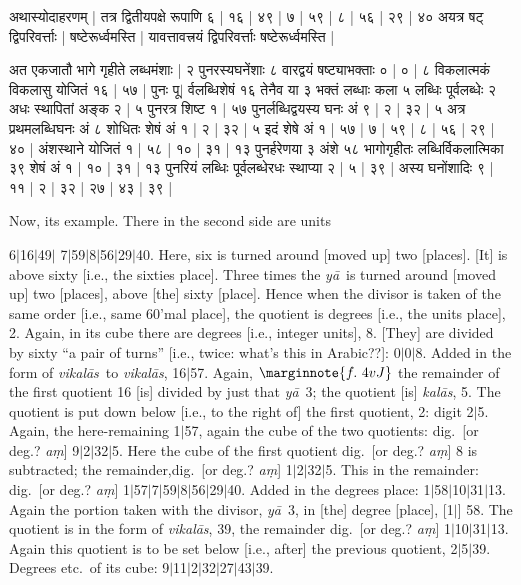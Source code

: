 \documentclass[12pt]{book}
\let\*=\d
\def\kalas{\textit{ka\-l\=as}}
\def\ya{\textit{y\=a}}
\def\vikalas{\textit{vi\-ka\-l\=as}}
\def\danda{$|$}
\begin{document}
\newpage

{\s अथास्योदाहरणम् |
तत्र द्वितीयपक्षे रूपाणि ६ | १६ | ४९ | ७ | ५९ | ८ | ५६ | २९ | ४० अयत्र षट् 
द्विपरिवर्त्ताः |
षष्टेरूर्ध्वमस्ति |
यावत्तावत्त्रयं द्विपरिवर्त्ताः षष्टेरूर्ध्वमस्ति |

अत एकजातौ भागे गृहीते लब्धमंशाः | २ पुनरस्यघनेंशाः ८ वारद्वयं षष्ट्याभक्ताः ० |
० | ८ विकलात्मकं विकलासु योजितं १६ | ५७ | पुनः पू$|$%
र्वलब्धिशेषं १६
तेनैव या ३ भक्तं लब्धाः कला ५ लब्धिः पूर्वलब्धेः २ अधः स्थापितां अङ्क २ | ५
पुनरत्र शिष्ट १ | ५७ पुनर्लब्धिद्वयस्य घनः अं ९ | २ | ३२ | ५
अत्र प्रथमलब्धिघनः अं ८
शोधितः शेषं अं १ | २ | ३२ | ५ इदं शेषे अं १ | ५७ | ७ | ५९ | ८ | ५६ | २९ | ४० | अंशस्थाने योजितं
१ | ५८ | १० | ३१ | १३ पुनर्हरेणया ३ अंशे ५८ भागोगृहीतः लब्धिर्विकलात्मिका ३९ शेषं अं १ | १० | ३१ | १३ पुनरियं लब्धिः पूर्वलब्धेरधः स्थाप्या २ | ५ |
३९ | अस्य घनोंशादिः ९ | ११ | २ | ३२ | २७ | ४३ | ३९ | }

\newpage 

Now, its example. There in the second side are units 

6\danda 16\danda 49\danda
7\danda 59\danda 8\danda 56\danda 29\danda 40. Here, six is turned around
[moved up] two [places]. [It] is above sixty [i.e., the sixties place]. 
Three times the \ya\ is turned around [moved up] two [places], above [the] sixty [place]. 
Hence when the divisor is taken of the same order [i.e., same 60'mal place],
the quotient is degrees [i.e., the
units place], 2.
Again, in its cube there are degrees [i.e., integer units], 8.
[They] are divided by sixty ``a pair of turns'' [i.e., twice: what's this in Arabic??]:
0\danda 0\danda 8. Added in the form of \vikalas\ to \vikalas,
16\danda 57.
Again,
$\marginnote{f.~4v J}$
the remainder of the first quotient 16 [is] divided by just that \ya\ 3; the quotient [is] \kalas, 5.
The quotient is put down below [i.e., to the right of] the first quotient, 2: digit 2\danda 5.
Again, the here-remaining 1\danda 57, again the cube of the two quotients: dig.\ [or deg.? \textit{a\*m}]
9\danda 2\danda 32\danda 5.  Here the cube of the first quotient  dig.\ [or deg.? \textit{a\*m}]
8 is subtracted; the remainder,dig.\ [or deg.? \textit{a\*m}]
1\danda 2\danda 32\danda 5. This in the remainder: dig.\ [or deg.? \textit{a\*m}]
1\danda 57\danda 7\danda 59\danda 8\danda 56\danda 29\danda 40. 
Added in the degrees place: 
1\danda 58\danda 10\danda 31\danda 13.
Again the portion taken with the divisor, \ya\ 3, in [the] degree [place], [1\danda] 58.
The quotient is in the form of \vikalas,
39, the remainder dig.\ [or deg.? \textit{a\*m}] 
1\danda 10\danda 31\danda 13. Again this quotient is to be set below [i.e., after] the 
previous quotient, 2\danda 5\danda 39.
Degrees etc.\ of its cube: 9\danda 11\danda 2\danda 32\danda 27\danda 43\danda 39.
\end{document}
